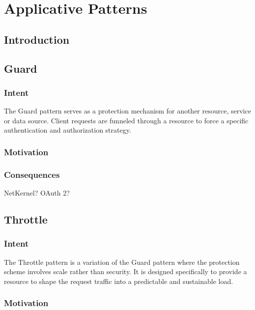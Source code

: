 \chapter{Applicative Patterns}
\label{ch02}

\section{Introduction}
\label{ch02.sec.1}

\newpage
\section{Guard}
\label{ch02.sec.2}

\subsection{Intent}
\label{ch02.sec.1.intent}
The Guard pattern serves as a protection mechanism for another resource, service or data source. Client requests are funneled through a resource to force a specific authentication and authorization strategy.

\subsection{Motivation}
\label{ch02.sec.1.motivation}

\subsection{Consequences}
\label{ch02.sec.1.consequences}

NetKernel?
OAuth 2?

\newpage
\section{Throttle}
\label{ch02.sec.3}

\subsection{Intent}
\label{ch02.sec.3.intent}
The Throttle pattern is a variation of the Guard pattern where the protection scheme involves scale rather than security. It is designed specifically to provide a resource to shape the request traffic into a predictable and sustainable load.

\subsection{Motivation}
\label{ch02.sec.3.motivation}


